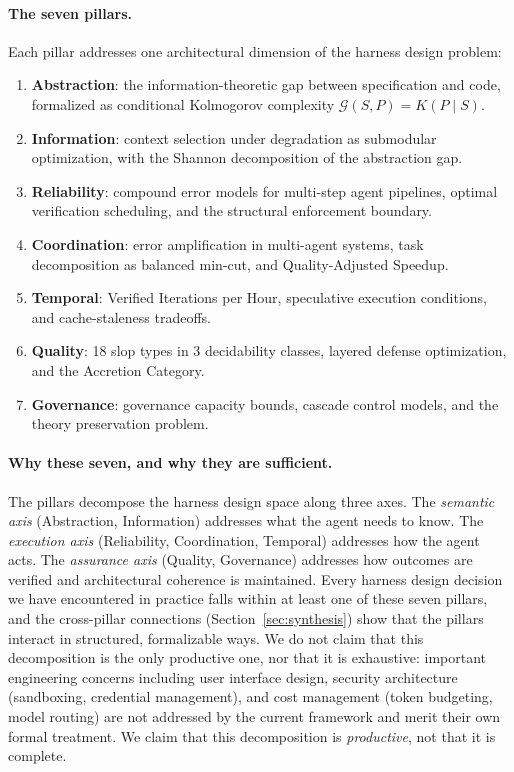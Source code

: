 \documentclass[11pt, a4paper, logo, copyright]{googledeepmind}
\begin{document}
\paragraph{The seven pillars.} Each pillar addresses one architectural dimension of the harness design problem:

\begin{enumerate}[label=(\roman*)]
    \item \textbf{Abstraction}: the information-theoretic gap between specification and code, formalized as conditional Kolmogorov complexity $\mathcal{G}(S,P) = K(P \mid S)$.
    \item \textbf{Information}: context selection under degradation as submodular optimization, with the Shannon decomposition of the abstraction gap.
    \item \textbf{Reliability}: compound error models for multi-step agent pipelines, optimal verification scheduling, and the structural enforcement boundary.
    \item \textbf{Coordination}: error amplification in multi-agent systems, task decomposition as balanced min-cut, and Quality-Adjusted Speedup.
    \item \textbf{Temporal}: Verified Iterations per Hour, speculative execution conditions, and cache-staleness tradeoffs.
    \item \textbf{Quality}: 18 slop types in 3 decidability classes, layered defense optimization, and the Accretion Category.
    \item \textbf{Governance}: governance capacity bounds, cascade control models, and the theory preservation problem.
\end{enumerate}

\paragraph{Why these seven, and why they are sufficient.} The pillars decompose the harness design space along three axes. The \emph{semantic axis} (Abstraction, Information) addresses what the agent needs to know. The \emph{execution axis} (Reliability, Coordination, Temporal) addresses how the agent acts. The \emph{assurance axis} (Quality, Governance) addresses how outcomes are verified and architectural coherence is maintained. Every harness design decision we have encountered in practice falls within at least one of these seven pillars, and the cross-pillar connections (Section~\ref{sec:synthesis}) show that the pillars interact in structured, formalizable ways. We do not claim that this decomposition is the only productive one, nor that it is exhaustive: important engineering concerns including user interface design, security architecture (sandboxing, credential management), and cost management (token budgeting, model routing) are not addressed by the current framework and merit their own formal treatment. We claim that this decomposition is \emph{productive}, not that it is complete.
\end{document}
